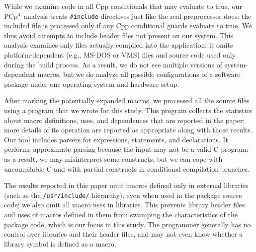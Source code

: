 \documentclass[10pt]{article}
\newcommand{\pcp}{\mbox{\textsf{PCp}$^3$}}
\newcommand{\file}[1]{\texttt{#1}}
\begin{document}
While we examine code in all Cpp conditionals that may evaluate to true,
our \pcp\ analysis treats {\tt \#include} directives just like the real
preprocessor does:  the included file is processed only if any Cpp
conditional guards evaluate to true.  We thus avoid attempts to include
header files not present on our system.  This analysis examines only files
actually compiled into the application; it omits platform-dependent
(e.g., MS-DOS or VMS) files and source code used only during the build
process.  As a result, we do not see multiple versions of system-dependent
macros, but we do analyze all possible configurations of a software package
under one operating system and hardware setup.







After marking the potentially expanded macros, we processed all the source
files using a program that we wrote for this study.  This program collects the
statistics about macro definitions, uses, and dependences that are
reported in the paper; more details of its operation are reported as
appropriate along with those results.  Our tool includes parsers for
expressions, statements, and declarations.  It performs approximate parsing
because the input may not be a valid C program; as a result, we may
misinterpret some constructs, but we can cope with uncompilable C and with
partial constructs in conditional compilation branches.

The results reported in this paper omit macros defined only in external
libraries (such as the \file{/usr/include/} hierarchy), even when used in
the package source code; we also omit all macro uses in libraries.  This
prevents library header files and uses of macros defined in them from
swamping the characteristics of the
package code, which is our focus in this study.  The programmer generally
has no control over libraries and their header files, and may not even know
whether a library symbol is defined as a macro.
\end{document}
